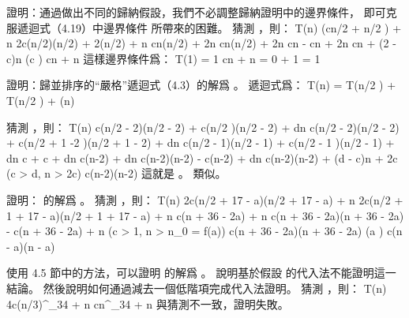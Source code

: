 \startEXERCISE
證明：通過做出不同的歸納假設，我們不必調整歸納證明中的邊界條件，
即可克服遞迴式（4.19）中邊界條件  所帶來的困難。
\stopEXERCISE
\startANSWER
猜測 ，則：
\startformula\startalign
\NC T(n) \NC {}(c\lfloor n/2 \rfloor{} + \lfloor n/2 \rfloor) + n \NR
\NC      \NC \le 2c(n/2)\lg(n/2) + 2(n/2) + n \NR
\NC      \NC \le cn\lg(n/2) + 2n \NR
\NC      \NC \le cn\lg(n/2) + 2n \NR
\NC      \NC \le cn - cn + 2n \NR
\NC      \NC \le cn + (2 - c)n \qquad (c )\NR
\NC      \NC \le cn + n \NR
\stopalign\stopformula
這樣邊界條件爲：
\startformula
T(1) = 1 \le cn + n = 0 + 1 = 1
\stopformula
\stopANSWER

\startEXERCISE
證明：歸並排序的“嚴格”遞迴式（4.3）的解爲 。
\stopEXERCISE
\startANSWER
遞迴式爲：
\startformula
T(n) = T(\lfloor n/2 \rfloor) + T(\lceil n/2 \rceil) + \Theta(n)
\stopformula

猜測 ，則：
\startformula\startalign
\NC T(n) \NC \le c(\lfloor n/2 \rfloor - 2)\lg(\lfloor n/2 \rfloor - 2) + c(\lceil n/2  )\lg(\lceil n/2 \rceil - 2) + dn \NR
\NC      \NC \le c(n/2 - 2)\lg(n/2 - 2) + c(n/2 + 1 -2 )\lg(n/2 + 1 - 2) + dn \NR
\NC      \NC \le c(n/2 - 1)\lg(n/2 - 1) + c(n/2 - 1 )\lg(n/2 - 1) + dn \NR
\NC      \NC \le c\lg{} + c\lg{} + dn \NR
\NC      \NC \le c(n-2)\lg{} + dn \NR
\NC      \NC \le c(n-2)\lg(n-2) - c(n-2) + dn \NR
\NC      \NC \le c(n-2)\lg(n-2) + (d - c)n + 2c \qquad (c > d, n > 2c)\NR
\NC      \NC \le c(n-2)\lg(n-2) \NR
\stopalign\stopformula
這就是 。  類似。
\stopANSWER

\startEXERCISE
證明：  的解爲 。
\stopEXERCISE
\startANSWER
猜測 ，則：
\startformula\startmathalignment[n=3]
\NC T(n) \NC \le 2c(\lfloor n/2 \rfloor + 17 - a)\lg(\lfloor n/2 \rfloor + 17 - a) + n \NC \NR
\NC      \NC \le 2c(n/2 + 1 + 17 - a)\lg(n/2 + 1 + 17 - a) + n \NC \NR
\NC      \NC \le c(n + 36 - 2a)\lg{} + n \NC \NR
\NC      \NC \le c(n + 36 - 2a)\lg(n + 36 - 2a) - c(n + 36 - 2a) + n \qquad\NC (c > 1, n > n_0 = f(a))\NR
\NC      \NC \le c(n + 36 - 2a)\lg(n + 36 - 2a)                      \NC (a ) \NR
\NC      \NC \le c(n - a)\lg(n - a) \NC \NR
\stopmathalignment\stopformula
\stopANSWER

\startEXERCISE
使用 4.5 節中的方法，可以證明  的解爲 。
說明基於假設  的代入法不能證明這一結論。
然後說明如何通過減去一個低階項完成代入法證明。
\stopEXERCISE
\startANSWER
猜測 ，則：
\startformula\startmathalignment
\NC T(n) \NC \le 4c(n/3)^{\log_3{4}} + n \NR
\NC      \NC \le cn^{\log_3{4}} + n \NR
\stopmathalignment\stopformula
與猜測不一致，證明失敗。

